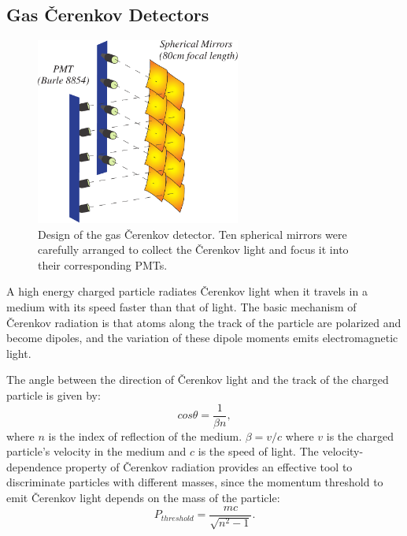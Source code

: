 \subsection{Gas \v{C}erenkov Detectors}
\begin{figure}[!ht]
 \begin{center}
  \includegraphics[width=0.6\textwidth]{./figures/cer/cerenkov_design}
  \caption[Design of the gas \v{C}erenkov detector]{\footnotesize{Design of the gas \v{C}erenkov detector. Ten spherical mirrors were carefully arranged to collect the \v{C}erenkov light and focus it into their corresponding PMTs.}}
  \label{gc_pmt}
 \end{center}
\end{figure}
 A high energy charged particle radiates \v{C}erenkov light when it travels in a medium with its speed faster than that of light. The basic mechanism of \v{C}erenkov radiation is that atoms along the track of the particle are polarized and become dipoles, and the variation of these dipole moments emits electromagnetic light\cite{R_Bock}. 
 
 The angle between the direction of \v{C}erenkov light and the track of the charged particle is given by:
\begin{equation}
 cos \theta = \frac{1}{\beta n},
\end{equation}
where $n$ is the index of reflection of the medium. $\beta=v/c$ where $v$ is the charged particle's velocity in the medium and $c$ is the speed of light. The velocity-dependence property of \v{C}erenkov radiation provides an effective tool to discriminate particles with different masses, since the momentum threshold to emit \v{C}erenkov light depends on the mass of the particle:
\begin{equation}
 P_{threshold} = \frac{mc}{\sqrt{n^{2}-1}}.
\end{equation}

